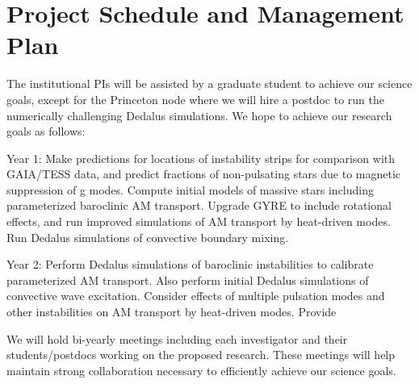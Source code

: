 \section{Project Schedule and Management Plan}

The institutional PIs will be assisted by a graduate student to achieve our science goals, except for the Princeton node where we will hire a postdoc to run the numerically challenging Dedalus simulations. We hope to achieve our research goals as follows:

Year 1: Make predictions for locations of instability strips for comparison with GAIA/TESS data, and predict fractions of non-pulsating stars due to magnetic suppression of g modes. Compute initial models of massive stars including parameterized baroclinic AM transport. Upgrade GYRE to include rotational effects, and run improved simulations of AM transport by heat-driven modes. Run Dedalus simulations of convective boundary mixing.

Year 2: Perform Dedalus simulations of baroclinic instabilities to calibrate parameterized AM transport. Also perform initial Dedalus simulations of convective wave excitation. Consider effects of multiple pulsation modes and other instabilities on AM transport by heat-driven modes. Provide 

We will  hold bi-yearly meetings including each investigator and their students/postdocs working on the proposed research. These meetings will help maintain strong collaboration necessary to efficiently achieve our science goals.
